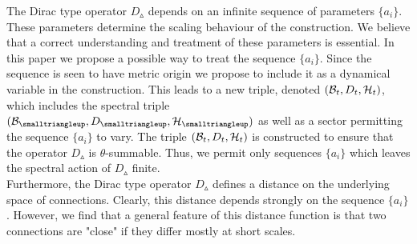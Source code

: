 \documentclass[12pt]{article}
\def\cb{{\cal B}}
\def\ch{{\cal H}}
\begin{document}
The Dirac type operator $D_{\smalltriangleup}$ depends on an infinite sequence of parameters $\{a_i\}$. These parameters determine the scaling behaviour of the construction. We believe that a correct understanding and treatment of these parameters is essential. In this paper we propose a possible way to treat the sequence $\{a_i\}$. Since the sequence is seen to have metric origin we propose to include it as a dynamical variable in the construction. This leads to a new triple, denoted $(\cb_t,D_t,\ch_t)$, which includes the spectral triple $(\cb_{\smalltriangleup},D_{\smalltriangleup},\ch_\smalltriangleup)$ as well as a sector permitting the sequence $\{a_i\}$ to vary. 
The triple $(\cb_t,D_t,\ch_t)$ is constructed to ensure that the operator $D_{\smalltriangleup}$ is $\theta$-summable. Thus, we permit only sequences $\{a_i\}$ which leaves the spectral action of $D_{\smalltriangleup}$ finite.\\ %



Furthermore, the Dirac type operator $D_\smalltriangleup$ defines a distance on the underlying space of connections. Clearly, this distance depends strongly on the sequence $\{a_i\}$. However, we find that a general feature of this distance function is that two connections are "close" if they differ mostly at short scales. \\





\end{document}
